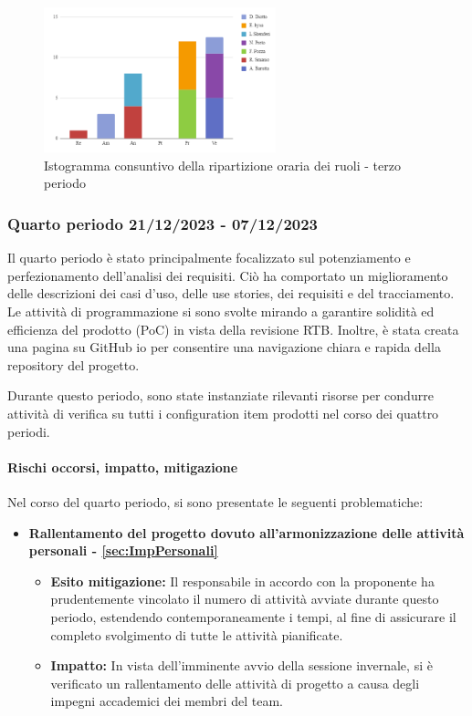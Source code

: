 \begin{figure}[H]
    \centering
    \includegraphics[width=0.6\textwidth]{../Images/consuntivoDivisioneRuoli3Periodo.png}
    \caption{Istogramma consuntivo della ripartizione oraria dei ruoli - terzo periodo}
    \label{fig:Consuntivo_ripartizione_oraria_3}
\end{figure}




\subsubsection{Quarto periodo  21/12/2023 - 07/12/2023}

Il quarto periodo è stato principalmente focalizzato sul potenziamento e perfezionamento dell'analisi dei requisiti. Ciò ha comportato un miglioramento delle descrizioni dei casi d'uso, delle use stories, dei requisiti e del tracciamento. Le attività di programmazione si sono svolte mirando a garantire solidità ed efficienza del prodotto (PoC) in vista della revisione RTB. Inoltre, è stata creata una pagina su GitHub io per consentire una navigazione chiara e rapida della repository del progetto.

Durante questo periodo, sono state instanziate rilevanti risorse per condurre attività di verifica su tutti i configuration item prodotti nel corso dei quattro periodi.

\paragraph{Rischi occorsi, impatto, mitigazione} 
Nel corso del quarto periodo, si sono presentate le seguenti problematiche:
\begin{itemize}
    \item \textbf{Rallentamento del progetto dovuto all’armonizzazione delle attività personali - \ref{sec:ImpPersonali}}
    \begin{itemize}
        \item \textbf{Esito mitigazione:} 
        Il responsabile in accordo con la proponente ha prudentemente vincolato il numero di attività avviate durante questo periodo, estendendo contemporaneamente i tempi, al fine di assicurare il completo svolgimento di tutte le attività pianificate.
        \item \textbf{Impatto:}
        In vista dell'imminente avvio della sessione invernale, si è verificato un rallentamento delle attività di progetto a causa degli impegni accademici dei membri del team.
        \end{itemize}
\end{itemize}


